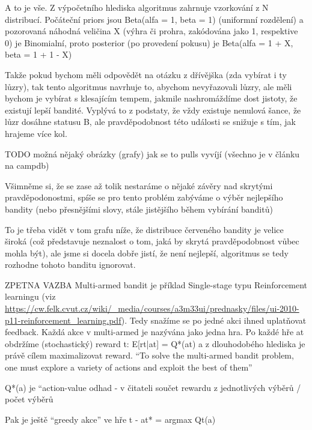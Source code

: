 \documentclass[thesis=M,czech]{FITthesis}[2014/05/07]
\begin{document}
A to je vše. Z výpočetního hlediska algoritmus zahrnuje vzorkování z N distribucí. Počáteční priors jsou Beta(alfa = 1, beta = 1) (uniformní rozdělení) a pozorovaná náhodná veličina X (výhra či prohra, zakódována jako 1, respektive 0) je Binomialní, proto posterior (po provedení pokusu) je Beta(alfa = 1 + X, beta = 1 + 1 - X)

Takže pokud bychom měli odpovědět na otázku z dřívějška (zda vybírat i ty lůzry), tak tento algoritmus navrhuje to, abychom nevyřazovali lůzry, ale měli bychom je vybírat s klesajícím tempem, jakmile nashromáždíme dost jistoty, že existují lepší bandité. Vyplývá to z podstaty, že vždy existuje nenulová šance, že lůzr dosáhne statusu B, ale pravděpodobnost této události se snižuje s tím, jak hrajeme více kol. 

TODO možná nějaký obrázky (grafy) jak se to pulls vyvíjí (všechno je v článku na campdb)

Všimněme si, že se zase až tolik nestaráme o nějaké závěry nad skrytými pravděpodonostmi, spíše se pro tento problém zabýváme o výběr nejlepšího bandity (nebo přesnějšími slovy, stále jistějšího během vybírání banditů)

To je třeba vidět v tom grafu níže, že distribuce červeného bandity je velice široká (což představuje neznalost o tom, jaká by skrytá pravděpodobnost vůbec mohla být), ale jsme si docela dobře jistí, že není nejlepší, algoritmus se tedy rozhodne tohoto banditu ignorovat.

ZPETNA VAZBA
Multi-armed bandit je příklad Single-stage typu Reinforcement learningu (viz \url{https://cw.felk.cvut.cz/wiki/_media/courses/a3m33ui/prednasky/files/ui-2010-p11-reinforcement_learning.pdf}). Tedy snažíme se po jedné akci ihned uplatňovat feedback. Každá akce v multi-armed je nazývána jako jedna hra. Po každé hře at obdržíme (stochastický) reward t:
E[rt|at] = Q*(at) a z dlouhodobého hlediska je právě cílem maximalizovat reward.
“To solve the multi-armed bandit problem, one must explore a variety of
actions and exploit the best of them”

Q*(a) je “action-value odhad - v čitateli součet rewardu z jednotlivých výběrů / počet výběrů

Pak je ještě “greedy akce” ve hře t - at* = argmax Qt(a) 
\end{document}
